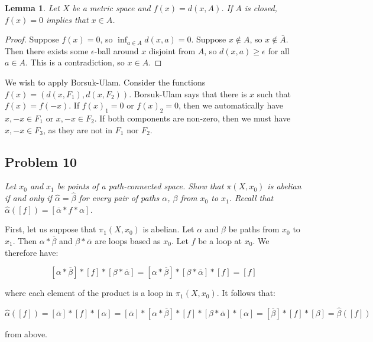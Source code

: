 \documentclass[10pt, oneside]{amsart}
\newtheorem{lem}{Lemma}
\begin{document}
    \begin{lem}
      Let $X$ be a metric space and $f(x) = d(x, A)$. If $A$ is closed, $f(x) = 0$ implies that $x \in A$.
    \end{lem}

    \begin{proof}
      Suppose $f(x) = 0$, so $\inf_{a \in A} d(x, a) = 0$. Suppose $x \notin A$, so $x \notin \bar{A}$. Then there exists some $\epsilon$-ball around
      $x$ disjoint from $A$, so $d(x, a) \geq \epsilon$ for all $a \in A$. This is a contradiction, so $x \in A$.
      \end{proof}

    We wish to apply Borsuk-Ulam. Consider the functions $f(x) = (d(x, F_1), d(x, F_2))$. Borsuk-Ulam says that there is $x$ such that $f(x) = f(-x)$. If $f(x)_1 = 0$
    or $f(x)_2 = 0$, then we automatically have $x, -x \in F_1$ or $x, -x \in F_2$. If both components are non-zero, then we must have $x, -x \in F_3$, as they are not in
    $F_1$ nor $F_2$.

    \hrulefill

    \subsection{Problem 10} \textit{Let $x_0$ and $x_1$ be points of a path-connected space. Show that $\pi(X, x_0)$ is abelian if and only if $\hat{\alpha} = \hat{\beta}$ for every pair
      of paths $\alpha$, $\beta$ from $x_0$ to $x_1$. Recall that $\hat{\alpha}([f]) = [\overline{\alpha} * f * \alpha]$.}
    \newline

    First, let us suppose that $\pi_1(X, x_0)$ is abelian. Let $\alpha$ and $\beta$ be paths from $x_0$ to $x_1$. Then $\alpha * \overline{\beta}$ and $\beta * \overline{\alpha}$ are loops based as $x_0$. Let $f$ be a loop at $x_0$. We therefore have:

    $$[\alpha * \overline{\beta}] * [f] * [\beta * \overline{\alpha}] = [\alpha * \overline{\beta}] * [\beta * \overline{\alpha}] * [f] = [f]$$

    where each element of the product is a loop in $\pi_1(X, x_0)$. It follows that:

    $$\hat{\alpha}([f]) = [\overline{\alpha}] * [f] * [\alpha] = [\overline{\alpha}] * [\alpha * \overline{\beta}] * [f] * [\beta * \overline{\alpha}] * [\alpha] = [\overline{\beta}] * [f] * [\beta] = \hat{\beta}([f])$$

    from above.
    \newline
\end{document}
